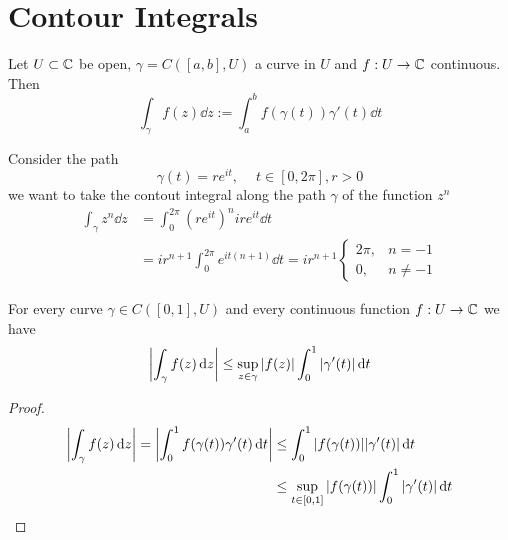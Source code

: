 \documentclass[../../script.tex]{subfiles}
\begin{document}
\section{Contour Integrals}

\begin{defi}
    Let $U \subset \mathbb{C}$ be open, $\gamma = C([a, b], U)$ a curve in $U$ and $f: U \rightarrow \mathbb{C}$ continuous. Then 
    \[
        \int_{\gamma} f(z) \dd{z} := \int_a^b f(\gamma(t)) \gamma'(t) \dd{t}
    \]
\end{defi}

\begin{eg}
    Consider the path 
    \[
        \gamma(t) = re^{it}, ~\quad t \in [0, 2\pi], r > 0
    \]
    we want to take the contout integral along the path $\gamma$ of the function $z^n$
    \begin{align*}
        \int_{\gamma} z^n \dd{z} &= \int_0^{2\pi} (r e^{it})^n ire^{it} \dd{t}\\
        &= ir^{n+1} \int_0^{2\pi} e^{it(n+1)} \dd{t} = ir^{n+1} \begin{cases}
            2\pi, & n = -1 \\
            0, & n \ne -1
        \end{cases} 
    \end{align*}
\end{eg}

\begin{lem}
    For every curve $\gamma \in C([0, 1], U)$ and every continuous function $f: U \rightarrow \mathbb{C}$ we have 
    \[
        \abs{\int_{\gamma} f(z) \dd{z}} \le \sup_{z \in \gamma} \abs{f(z)} \int_0^1 \abs{\gamma'(t)} \dd{t}
    \]
\end{lem}
\begin{proof}
    \begin{equation}
        \begin{split}
            \abs{\int_{\gamma} f(z) \dd{z}} = \abs{\int_0^1 f(\gamma(t)) \gamma'(t) \dd{t}} &\le \int_0^1 \abs{f(\gamma(t))} \abs{\gamma'(t)} \dd{t} \\
            &\le \sup_{t \in [0, 1]} \abs{f(\gamma(t))} \int_0^1 \abs{\gamma'(t)} \dd{t}
        \end{split}
    \end{equation}
\end{proof}
\end{document}
